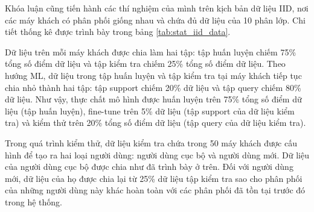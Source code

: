 Khóa luận cũng tiến hành các thí nghiệm của mình trên kịch bản dữ liệu IID, nơi các máy khách có phân phối giống nhau và chứa đủ dữ liệu của 10 phân lớp. Chi tiết thống kê được trình bày trong bảng \ref{tab:stat_iid_data}.

\begin{table}[H]
    \caption{Thống kê trên hai tập dữ liệu MNIST và CIFAR-10 (dữ liệu IID)}
    \label{tab:stat_iid_data}
\end{table}

Dữ liệu trên mỗi máy khách được chia làm hai tập: tập huấn luyện chiếm 75\% tổng số điểm dữ liệu và tập kiểm tra chiếm 25\% tổng số điểm dữ liệu. Theo hướng ML, dữ liệu trong tập huấn luyện và tập kiểm tra tại máy khách tiếp tục chia nhỏ thành hai tập: tập support chiếm 20\% dữ liệu và tập query chiếm 80\% dữ liệu. Như vậy, thực chất mô hình được huấn luyện trên 75\% tổng số điểm dữ liệu (tập huấn luyện), fine-tune trên 5\% dữ liệu (tập support của dữ liệu kiểm tra) và kiểm thử trên 20\% tổng số điểm dữ liệu (tập query của dữ liệu kiểm tra).

Trong quá trình kiểm thử, dữ liệu kiểm tra chứa trong 50 máy khách được cấu hình để tạo ra hai loại người dùng: người dùng cục bộ và người dùng mới. Dữ liệu của người dùng cục bộ được chia như đã trình bày ở trên. Đối với người dùng mới, dữ liệu của họ được chia lại từ 25\% dữ liệu tập kiểm tra sao cho phân phối của những người dùng này khác hoàn toàn với các phân phối đã tồn tại trước đó trong hệ thống.

